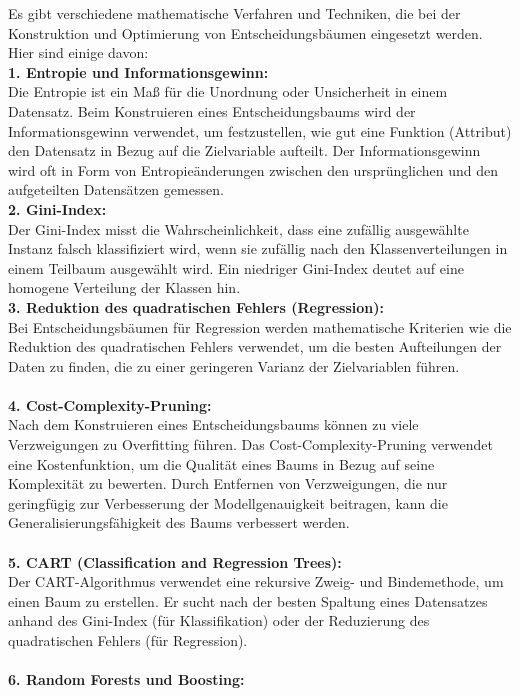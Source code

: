 \documentclass[12pt]{article}
\begin{document}
Es gibt verschiedene mathematische Verfahren und Techniken, die bei der Konstruktion und Optimierung von Entscheidungsbäumen eingesetzt werden. Hier sind einige davon:\\[0.2cm]
%
\textbf{1. Entropie und Informationsgewinn:}\\
Die Entropie ist ein Maß für die Unordnung oder Unsicherheit in einem Datensatz. Beim Konstruieren eines Entscheidungsbaums wird der Informationsgewinn verwendet, um festzustellen, wie gut eine Funktion (Attribut) den Datensatz in Bezug auf die Zielvariable aufteilt. Der Informationsgewinn wird oft in Form von Entropieänderungen zwischen den ursprünglichen und den aufgeteilten Datensätzen gemessen.\\[0.2cm]
%
\textbf{2. Gini-Index:}\\
Der Gini-Index misst die Wahrscheinlichkeit, dass eine zufällig ausgewählte Instanz falsch klassifiziert wird, wenn sie zufällig nach den Klassenverteilungen in einem Teilbaum ausgewählt wird. Ein niedriger Gini-Index deutet auf eine homogene Verteilung der Klassen hin.\\[0.2cm]
%
\textbf{3. Reduktion des quadratischen Fehlers (Regression):}\\
Bei Entscheidungsbäumen für Regression werden mathematische Kriterien wie die Reduktion des quadratischen Fehlers verwendet, um die besten Aufteilungen der Daten zu finden, die zu einer geringeren Varianz der Zielvariablen führen.\\\\[0.2cm]
%
\textbf{4. Cost-Complexity-Pruning:}\\
Nach dem Konstruieren eines Entscheidungsbaums können zu viele Verzweigungen zu Overfitting führen. Das Cost-Complexity-Pruning verwendet eine Kostenfunktion, um die Qualität eines Baums in Bezug auf seine Komplexität zu bewerten. Durch Entfernen von Verzweigungen, die nur geringfügig zur Verbesserung der Modellgenauigkeit beitragen, kann die Generalisierungsfähigkeit des Baums verbessert werden.\\\\[0.2cm]
%
\textbf{5. CART (Classification and Regression Trees):}\\
Der CART-Algorithmus verwendet eine rekursive Zweig- und Bindemethode, um einen Baum zu erstellen. Er sucht nach der besten Spaltung eines Datensatzes anhand des Gini-Index (für Klassifikation) oder der Reduzierung des quadratischen Fehlers (für Regression).\\\\[0.2cm]
%
\textbf{6. Random Forests und Boosting:}\\
\end{document}
